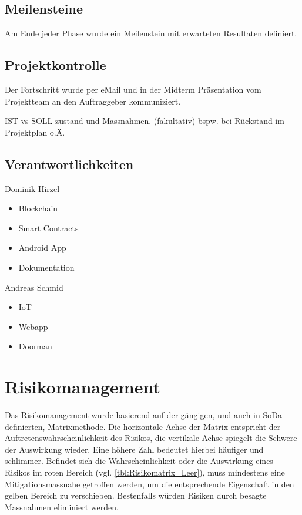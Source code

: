 \subsection{Meilensteine}
Am Ende jeder Phase wurde ein Meilenstein mit erwarteten Resultaten definiert.

\subsection{Projektkontrolle}
Der Fortschritt wurde per eMail und in der Midterm Präsentation vom Projektteam an den Auftraggeber kommuniziert.

IST vs SOLL zustand und Massnahmen. (fakultativ)
bspw. bei Rückstand im Projektplan o.Ä.


\subsection{Verantwortlichkeiten}
Dominik Hirzel
\begin{itemize}
    \item Blockchain
    \item Smart Contracts
    \item Android App
    \item Dokumentation
\end{itemize}

Andreas Schmid
\begin{itemize}
    \item IoT
    \item Webapp
    \item Doorman
\end{itemize}


\section{Risikomanagement}
Das Risikomanagement wurde basierend auf der gängigen, und auch in SoDa definierten, Matrixmethode. Die horizontale Achse der Matrix entspricht der Auftretenswahrscheinlichkeit des Risikos, die vertikale Achse spiegelt die Schwere der Auswirkung wieder. Eine höhere Zahl bedeutet hierbei häufiger und schlimmer. Befindet sich die Wahrscheinlichkeit oder die Auswirkung eines Risikos im roten Bereich (vgl. \ref{tbl:Risikomatrix_Leer}), muss mindestens eine Mitigationsmassnahe getroffen werden, um die entsprechende Eigenschaft in den gelben Bereich zu verschieben. Bestenfalls würden Risiken durch besagte Massnahmen eliminiert werden.

